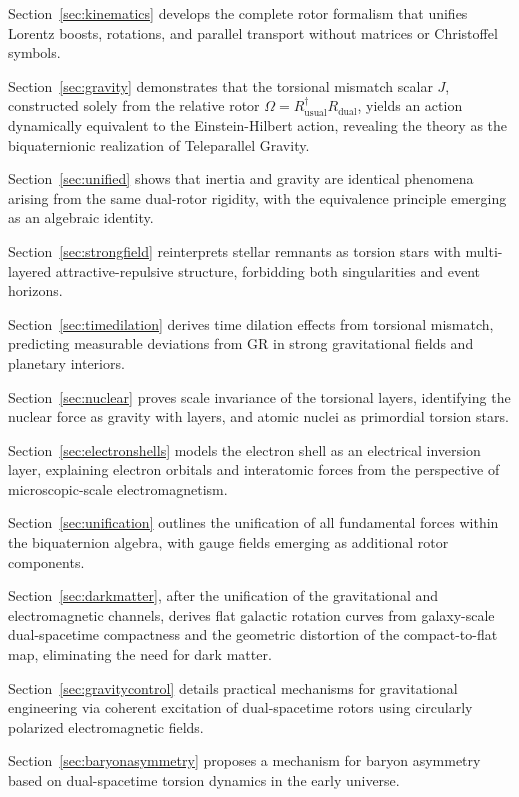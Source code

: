 \documentclass[dvipdfmx,a4paper]{article}
\begin{document}
Section~\ref{sec:kinematics} develops the complete rotor formalism that unifies Lorentz boosts, rotations, and parallel transport without matrices or Christoffel symbols.

Section~\ref{sec:gravity} demonstrates that the torsional mismatch scalar $J$, constructed solely from the relative rotor $\Omega = R_\text{usual}^\dagger R_{\text{dual}}$, yields an action dynamically equivalent to the Einstein-Hilbert action, revealing the theory as the biquaternionic realization of Teleparallel Gravity.

Section~\ref{sec:unified} shows that inertia and gravity are identical phenomena arising from the same dual-rotor rigidity, with the equivalence principle emerging as an algebraic identity.

Section~\ref{sec:strongfield} reinterprets stellar remnants as torsion stars with multi-layered attractive-repulsive structure, forbidding both singularities and event horizons.

Section~\ref{sec:timedilation} derives time dilation effects from torsional mismatch, predicting measurable deviations from GR in strong gravitational fields and planetary interiors.

Section~\ref{sec:nuclear} proves scale invariance of the torsional layers, identifying the nuclear force as gravity with layers, and atomic nuclei as primordial torsion stars.

Section~\ref{sec:electronshells} models the electron shell as an electrical inversion layer, explaining electron orbitals and interatomic forces from the perspective of microscopic-scale electromagnetism.

Section~\ref{sec:unification} outlines the unification of all fundamental forces within the biquaternion algebra, with gauge fields emerging as additional rotor components.

Section~\ref{sec:darkmatter}, after the unification of the gravitational and electromagnetic channels, derives flat galactic rotation curves from galaxy-scale dual-spacetime compactness and the geometric distortion of the compact-to-flat map, eliminating the need for dark matter.

Section~\ref{sec:gravitycontrol} details practical mechanisms for gravitational engineering via coherent excitation of dual-spacetime rotors using circularly polarized electromagnetic fields.

Section~\ref{sec:baryonasymmetry} proposes a mechanism for baryon asymmetry based on dual-spacetime torsion dynamics in the early universe.
\end{document}
